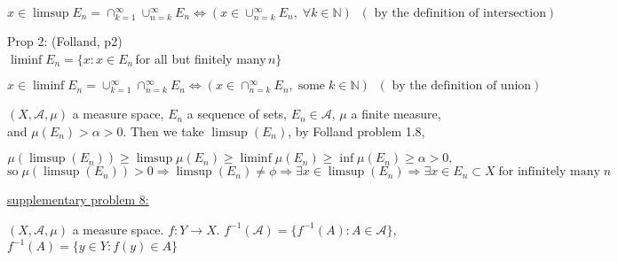 \documentclass[12pt]{article}
\begin{document}
\vspace{-0.4in}

\begin{equation*}
x \in \limsup E_n = \cap_{k=1}^{\infty} \cup_{n=k}^{\infty} E_n \Leftrightarrow \left( x \in \cup_{n=k}^{\infty} E_n, \; \forall k \in \mathbb{N} \right) \; \; \left( \textrm{ by the definition of intersection} \right )
\end{equation*}

\begin{flushleft}
Prop 2: (Folland, p2) \\
$\liminf E_n = \{ x : x \in E_n \,$for all but finitely many$\, n \}$
\end{flushleft}

\vspace{-0.4in}

\begin{equation*}
x \in \liminf E_n = \cup_{k=1}^{\infty} \cap_{n=k}^{\infty} E_n \Leftrightarrow \left( x \in \cap_{n=k}^{\infty} E_n, \; \textrm{some} \; k \in \mathbb{N} \right) \; \; \left( \textrm{ by the definition of union} \right )
\end{equation*}



\begin{flushleft}
$(X,\mathcal{A},\mu)$ a measure space, $E_n$ a sequence of sets, $E_n \in \mathcal{A}$, $\mu$ a finite measure, and $\mu(E_n)>\alpha>0$. Then we take $\limsup(E_n)$, by Folland problem 1.8, 
\end{flushleft}

\vspace{-0.2in}

\begin{equation*} 
\mu(\limsup(E_n)) \ge \limsup \mu(E_n) \ge \liminf \mu(E_n) \ge \inf \mu(E_n) \ge \alpha > 0,
\end{equation*}
\begin{equation*} 
\textrm{so} \;  \mu(\limsup(E_n)) > 0 \Rightarrow \limsup(E_n) \not = \phi \Rightarrow \exists x \in \limsup(E_n) \Rightarrow \exists x \in E_n \subset X \; \textrm{for infinitely many} \; n
\end{equation*}

\begin{flushleft}
\underline{supplementary problem 8:}
\end{flushleft}

\begin{flushleft}
$(X,\mathcal{A},\mu)$ a measure space. $f: Y \rightarrow X$. $f^{-1}(\mathcal{A}) = \{ f^{-1}(A): A \in \mathcal{A}   \}$, $f^{-1}(A) = \{ y \in Y: f(y) \in A \}$
\end{flushleft}
\end{document}
